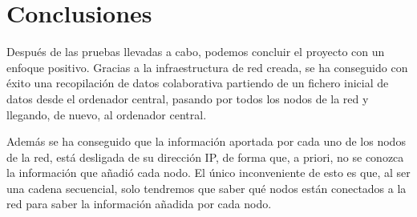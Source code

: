 \section{Conclusiones}
Después de las pruebas llevadas a cabo, podemos concluir el proyecto con un enfoque positivo. Gracias a la infraestructura de red creada, se ha conseguido con éxito una recopilación de datos colaborativa partiendo de un fichero inicial de datos desde el ordenador central, pasando por todos los nodos de la red y llegando, de nuevo, al ordenador central.

Además se ha conseguido que la información aportada por cada uno de los nodos de la red, está desligada de su dirección IP, de forma que, a priori, no se conozca la información que añadió cada nodo. El único inconveniente de esto es que, al ser una cadena secuencial, solo tendremos que saber qué nodos están conectados a la red para saber la información añadida por cada nodo.

